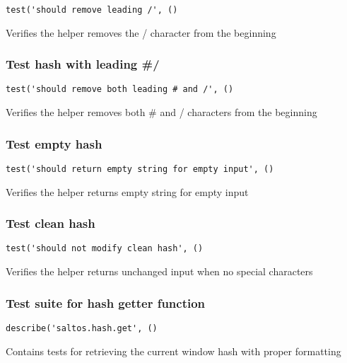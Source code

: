 \documentclass[a4paper]{article}
\begin{document}
\begin{lstlisting}
test('should remove leading /', ()
\end{lstlisting}

Verifies the helper removes the / character from the beginning

\hypertarget{toc196}{}
\subsubsection{Test hash with leading \#/}

\begin{lstlisting}
test('should remove both leading # and /', ()
\end{lstlisting}

Verifies the helper removes both \# and / characters from the beginning

\hypertarget{toc197}{}
\subsubsection{Test empty hash}

\begin{lstlisting}
test('should return empty string for empty input', ()
\end{lstlisting}

Verifies the helper returns empty string for empty input

\hypertarget{toc198}{}
\subsubsection{Test clean hash}

\begin{lstlisting}
test('should not modify clean hash', ()
\end{lstlisting}

Verifies the helper returns unchanged input when no special characters

\hypertarget{toc199}{}
\subsubsection{Test suite for hash getter function}

\begin{lstlisting}
describe('saltos.hash.get', ()
\end{lstlisting}

Contains tests for retrieving the current window hash
with proper formatting

\hypertarget{toc200}{}
\end{document}

